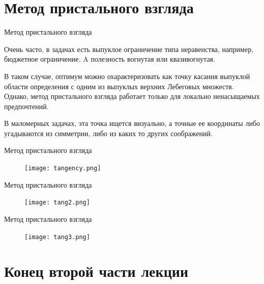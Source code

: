 \documentclass{beamer}
\begin{document}
\section{Метод пристального взгляда}

\begin{frame}{Метод пристального взгляда}

Очень часто, в задачах есть выпуклое ограничение типа неравенства, например, бюджетное ограничение. A полезность вогнутая или квазивогнутая.

В таком случае, оптимум можно охарактеризовать как точку касания выпуклой области определения с одним из выпуклых верхних Лебеговых множеств. Однако, \alert{метод пристального взгляда работает только для локально ненасыщаемых предпочтений}. 

В маломерных задачах, эта точка ищется визуально, а точные ее координаты либо угадываются из симметрии, либо из каких то других соображений.

\end{frame}

\begin{frame}{Метод пристального взгляда}

\begin{figure}[hbt]
\centering
\texttt{[image: tangency.png]}
\end{figure}

\end{frame}
\begin{frame}{Метод пристального взгляда}

\begin{figure}[hbt]
\centering
\texttt{[image: tang2.png]}
\end{figure}

\end{frame}
\begin{frame}{Метод пристального взгляда}

\begin{figure}[hbt]
\centering
\texttt{[image: tang3.png]}
\end{figure}

\end{frame}

\section{Конец второй части лекции}
\end{document}
